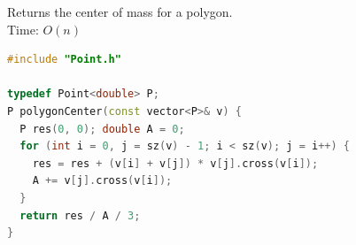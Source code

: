 Returns the center of mass for a polygon.\\
Time: $O(n)$
\begin{lstlisting}[style=codebook, language=C++]
#include "Point.h"

typedef Point<double> P;
P polygonCenter(const vector<P>& v) {
  P res(0, 0); double A = 0;
  for (int i = 0, j = sz(v) - 1; i < sz(v); j = i++) {
    res = res + (v[i] + v[j]) * v[j].cross(v[i]);
    A += v[j].cross(v[i]);
  }
  return res / A / 3;
}
\end{lstlisting}
